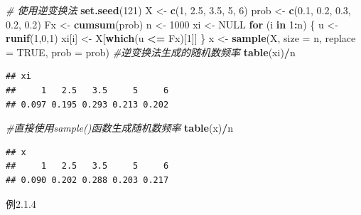 \documentclass[
]{article}
\newenvironment{Shaded}{\begin{snugshade}}{\end{snugshade}}
\newcommand{\AttributeTok}[1]{\textcolor[rgb]{0.13,0.29,0.53}{#1}}
\newcommand{\CommentTok}[1]{\textcolor[rgb]{0.56,0.35,0.01}{\textit{#1}}}
\newcommand{\ConstantTok}[1]{\textcolor[rgb]{0.56,0.35,0.01}{#1}}
\newcommand{\ControlFlowTok}[1]{\textcolor[rgb]{0.13,0.29,0.53}{\textbf{#1}}}
\newcommand{\DecValTok}[1]{\textcolor[rgb]{0.00,0.00,0.81}{#1}}
\newcommand{\FloatTok}[1]{\textcolor[rgb]{0.00,0.00,0.81}{#1}}
\newcommand{\FunctionTok}[1]{\textcolor[rgb]{0.13,0.29,0.53}{\textbf{#1}}}
\newcommand{\NormalTok}[1]{#1}
\newcommand{\OtherTok}[1]{\textcolor[rgb]{0.56,0.35,0.01}{#1}}
\newcommand{\SpecialCharTok}[1]{\textcolor[rgb]{0.81,0.36,0.00}{\textbf{#1}}}
\begin{document}
\begin{Shaded}
\begin{Highlighting}[]
\CommentTok{\# 使用逆变换法}
\FunctionTok{set.seed}\NormalTok{(}\DecValTok{121}\NormalTok{)}
\NormalTok{X }\OtherTok{\textless{}{-}} \FunctionTok{c}\NormalTok{(}\DecValTok{1}\NormalTok{, }\FloatTok{2.5}\NormalTok{, }\FloatTok{3.5}\NormalTok{, }\DecValTok{5}\NormalTok{, }\DecValTok{6}\NormalTok{)}
\NormalTok{prob }\OtherTok{\textless{}{-}} \FunctionTok{c}\NormalTok{(}\FloatTok{0.1}\NormalTok{, }\FloatTok{0.2}\NormalTok{, }\FloatTok{0.3}\NormalTok{, }\FloatTok{0.2}\NormalTok{, }\FloatTok{0.2}\NormalTok{)}
\NormalTok{Fx }\OtherTok{\textless{}{-}} \FunctionTok{cumsum}\NormalTok{(prob)}
\NormalTok{n }\OtherTok{\textless{}{-}} \DecValTok{1000}
\NormalTok{xi }\OtherTok{\textless{}{-}} \ConstantTok{NULL}
\ControlFlowTok{for}\NormalTok{ (i }\ControlFlowTok{in} \DecValTok{1}\SpecialCharTok{:}\NormalTok{n) \{}
\NormalTok{  u }\OtherTok{\textless{}{-}} \FunctionTok{runif}\NormalTok{(}\DecValTok{1}\NormalTok{,}\DecValTok{0}\NormalTok{,}\DecValTok{1}\NormalTok{)}
\NormalTok{  xi[i] }\OtherTok{\textless{}{-}}\NormalTok{ X[}\FunctionTok{which}\NormalTok{(u }\SpecialCharTok{\textless{}=}\NormalTok{ Fx)[}\DecValTok{1}\NormalTok{]]}
\NormalTok{\}}
\NormalTok{x }\OtherTok{\textless{}{-}} \FunctionTok{sample}\NormalTok{(X, }\AttributeTok{size =}\NormalTok{ n, }\AttributeTok{replace =} \ConstantTok{TRUE}\NormalTok{, }\AttributeTok{prob =}\NormalTok{ prob)}
\CommentTok{\#逆变换法生成的随机数频率}
\FunctionTok{table}\NormalTok{(xi)}\SpecialCharTok{/}\NormalTok{n}
\end{Highlighting}
\end{Shaded}

\begin{verbatim}
## xi
##     1   2.5   3.5     5     6 
## 0.097 0.195 0.293 0.213 0.202
\end{verbatim}

\begin{Shaded}
\begin{Highlighting}[]
\CommentTok{\#直接使用sample()函数生成随机数频率}
\FunctionTok{table}\NormalTok{(x)}\SpecialCharTok{/}\NormalTok{n}
\end{Highlighting}
\end{Shaded}

\begin{verbatim}
## x
##     1   2.5   3.5     5     6 
## 0.090 0.202 0.288 0.203 0.217
\end{verbatim}

例2.1.4
\end{document}
